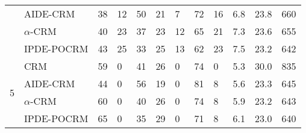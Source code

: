\begin{tabular*}{\textwidth}{@{\extracolsep\fill}clllllllllll@{\extracolsep\fill}}
 & AIDE-CRM & 38 & 12 & 50 & 21 & 7 & 72 & 16 & 6.8 & 23.8 & 660\\
 & $\alpha$-CRM & 40 & 23 & 37 & 23 & 12 & 65 & 21 & 7.3 & 23.6 & 655\\
 & IPDE-POCRM & 43 & 25 & 33 & 25 & 13 & 62 & 23 & 7.5 & 23.2 & 642\\
\midrule
\multirow{4}{2em}{5} & CRM & 59 & 0 & 41 & 26 & 0 & 74 & 0 & 5.3 & 30.0 & 835\\
 & AIDE-CRM & 44 & 0 & 56 & 19 & 0 & 81 & 8 & 5.6 & 23.3 & 645\\
 & $\alpha$-CRM & 60 & 0 & 40 & 26 & 0 & 74 & 8 & 5.9 & 23.2 & 643\\
 & IPDE-POCRM & 65 & 0 & 35 & 29 & 0 & 71 & 8 & 6.1 & 23.0 & 640\\
\bottomrule
\end{tabular*}

